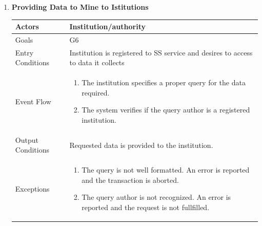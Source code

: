 \begin{enumerate}
	\item \textbf{Providing Data to Mine to Istitutions}
		\begin{table}[h!]
		\centering
		\begin{tabular}{|l|p{}|}
		\hline
		Actors            			&       	Institution/authority\\ \hline
		Goals             			&         	G6\\ \hline
		Entry Conditions  	&  		Institution is registered to SS service and desires to access to data it collects\\ \hline
		Event Flow        		&          
				\begin{enumerate}[label=\alph*)]
					\item The institution specifies a proper query for the data required.
					\item The system verifies if the query author is a registered institution.
					\end{enumerate}\\ \hline
		Output Conditions &    		Requested data is provided to the institution. \\ \hline
		Exceptions        		&
		       	\begin{enumerate}[label=\alph*)]
		       		\item The query is not well formatted. An error is reported and the transaction is aborted.
		       		\item The query author is not recognized. An error is reported and the request is not fullfilled. 
		       	\end{enumerate}\\ \hline
	\end{tabular}
	\end{table}
	
		\clearpage
	

\end{enumerate}
